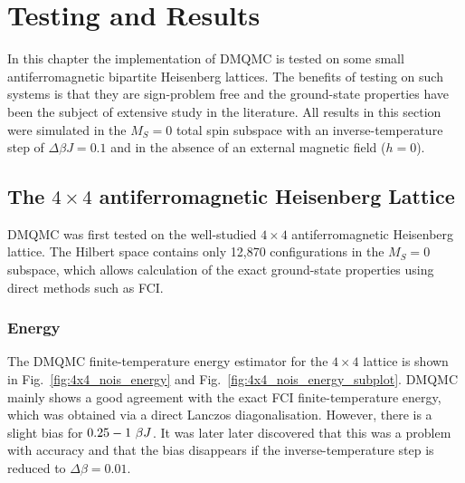 \chapter{Testing and Results}
\label{ch:chapter2}
\ifpdf
    \graphicspath{{Chapter2/Chapter2Figs/PNG/}{Chapter2/Chapter2Figs/PDF/}{Chapter2/Chapter2Figs/}}
\else
    \graphicspath{{Chapter2/Chapter2Figs/EPS/}{Chapter2/Chapter2Figs/}}
\fi

In this chapter the implementation of DMQMC is tested on some small antiferromagnetic bipartite Heisenberg lattices. The benefits of testing on such systems is that they are sign-problem free\cite{Spencer2012} and the ground-state properties have been the subject of extensive study in the literature. All results in this section were simulated in the $M_S=0$ total spin subspace with an inverse-temperature step of $\Delta\beta J = 0.1$ and in the absence of an external magnetic field ($h=0$).


\section{The $4\times4$ antiferromagnetic Heisenberg Lattice}
DMQMC was first tested on the well-studied $4\times4$ antiferromagnetic Heisenberg lattice. The Hilbert space contains only 12,870 configurations in the $M_S=0$ subspace, which allows calculation of the exact ground-state properties using direct methods such as FCI. 

\subsection{Energy}
The DMQMC finite-temperature energy estimator for the $4\times4$ lattice is shown in Fig.~\ref{fig:4x4_nois_energy} and Fig.~\ref{fig:4x4_nois_energy_subplot}. DMQMC mainly shows a good agreement with the exact FCI finite-temperature energy, which was obtained via a direct Lanczos diagonalisation\cite{SpencerFCI}. However, there is a slight bias for $0.25-1\textnormal{ }\beta J$. It was later later discovered that this was a problem with accuracy and that the bias disappears if the inverse-temperature step is reduced to $\Delta\beta =0.01$.

